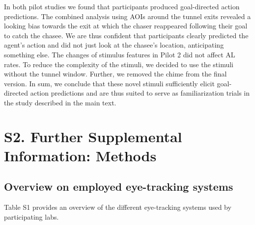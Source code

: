 \documentclass[
  man, donotrepeattitle,floatsintext]{apa6}
\begin{document}
In both pilot studies we found that participants produced goal-directed action predictions. The combined analysis using AOIs around the tunnel exits revealed a looking bias towards the exit at which the chaser reappeared following their goal to catch the chasee. We are thus confident that participants clearly predicted the agent's action and did not just look at the chasee's location, anticipating something else. The changes of stimulus features in Pilot 2 did not affect AL rates. To reduce the complexity of the stimuli, we decided to use the stimuli without the tunnel window. Further, we removed the chime from the final version. In sum, we conclude that these novel stimuli sufficiently elicit goal-directed action predictions and are thus suited to serve as familiarization trials in the study described in the main text.

\section{S2. Further Supplemental Information: Methods}\label{s2.-further-supplemental-information-methods}

\subsection{Overview on employed eye-tracking systems}\label{overview-on-employed-eye-tracking-systems}

Table S1 provides an overview of the different eye-tracking systems used by participating labs.
\end{document}
